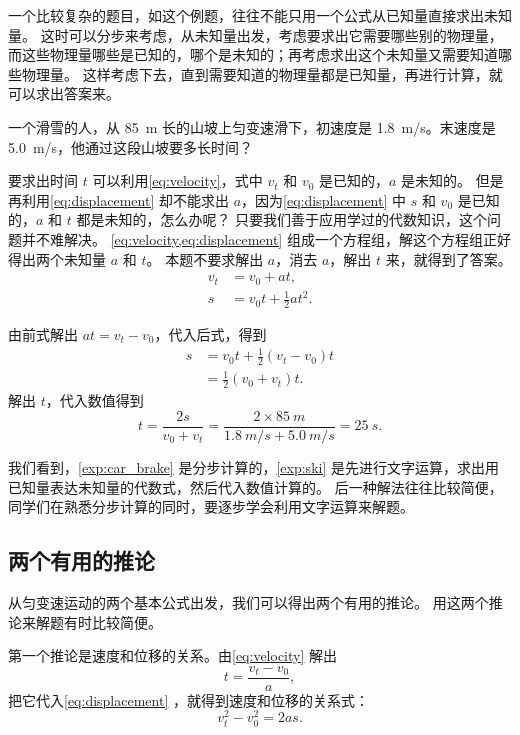一个比较复杂的题目，如这个例题，往往不能只用一个公式从已知量直接求出未知量。
这时可以分步来考虑，从未知量出发，考虑要求出它需要哪些别的物理量，而这些物理量哪些是已知的，哪个是未知的；再考虑求出这个未知量又需要知道哪些物理量。
这样考虑下去，直到需要知道的物理量都是已知量，再进行计算，就可以求出答案来。

\begin{example}\label{exp:ski}
一个滑雪的人，从 \qty{85}{m} 长的山坡上匀变速滑下，初速度是 \qty{1.8}{m/s}。末速度是 \qty{5.0}{m/s}，他通过这段山坡要多长时间？
\end{example}

\begin{solution}
要求出时间 $t$ 可以利用\cref{eq:velocity}，式中 $v_t$ 和 $v_0$ 是已知的，$a$ 是未知的。
但是再利用\cref{eq:displacement} 却不能求出 $a$，因为\cref{eq:displacement} 中 $s$ 和 $v_0$ 是已知的，$a$ 和 $t$ 都是未知的，怎么办呢？
只要我们善于应用学过的代数知识，这个问题并不难解决。
\cref{eq:velocity,eq:displacement} 组成一个方程组，解这个方程组正好得出两个未知量 $a$ 和 $t$。
本题不要求解出 $a$，消去 $a$，解出 $t$ 来，就得到了答案。
\begin{align*}
v_t&=v_0+at,\\
s&=v_0 t+\frac{1}{2}at^2.
\end{align*}

由前式解出 $at=v_t-v_0$，代入后式，得到
\[\begin{split}
s&=v_0t+\frac{1}{2}(v_t-v_0)t\\
&=\frac{1}{2}(v_0+v_t)t.
\end{split} \]
解出 $t$，代入数值得到
\[t=\frac{2s}{v_0+v_t}=\frac{2\times \qty{85}{m}}{\qty{1.8}{m/s}+\qty{5.0}{m/s}}=\qty{25}{s}.\]
\end{solution}

我们看到，\cref{exp:car_brake} 是分步计算的，\cref{exp:ski} 是先进行文字运算，求出用已知量表达未知量的代数式，然后代入数值计算的。
后一种解法往往比较简便，同学们在熟悉分步计算的同时，要逐步学会利用文字运算来解题。

\subsection{两个有用的推论}

从匀变速运动的两个基本公式出发，我们可以得出两个有用的推论。
用这两个推论来解题有时比较简便。

第一个推论是速度和位移的关系。由\cref{eq:velocity} 解出
\[t=\frac{v_t-v_0}{a},\]
把它代入\cref{eq:displacement} ，就得到速度和位移的关系式：
\begin{equation}
  \label{eq:velocity_squred_subtraction}
v^2_t-v^2_0=2as.
\end{equation}

